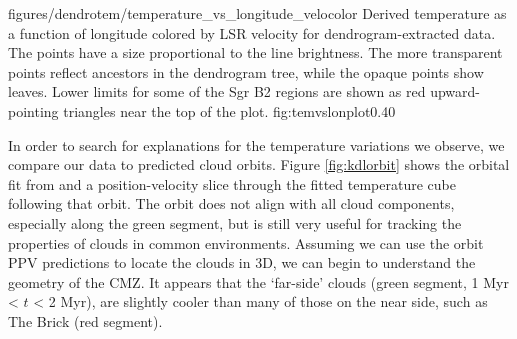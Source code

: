 

\Figure
{figures/dendrotem/temperature_vs_longitude_velocolor}
{Derived temperature as a function of longitude colored by LSR velocity for
dendrogram-extracted data.  The points have a size proportional to the
\threeohthree line brightness.  The more transparent points reflect ancestors
in the dendrogram tree, while the opaque points show leaves.  Lower limits
for some of the Sgr B2 regions are shown as red upward-pointing triangles near
the top of the plot.}
{fig:temvslonplot}{0.4}{0}

In order to search for explanations for the temperature variations we observe,
we compare our data to predicted cloud orbits.  Figure \ref{fig:kdlorbit} shows
the orbital fit from \citet{Kruijssen2015a} and a position-velocity slice
through the fitted temperature cube following that orbit.  The orbit does not
align with all cloud components, especially along the green segment, but is still
very useful for
tracking the properties of clouds in common environments.  Assuming we can use
the orbit PPV predictions to locate the clouds in 3D, we can begin to
understand the geometry of the CMZ.  It appears that the
`far-side' clouds (green segment, 1 Myr < $t$ < 2 Myr), are slightly cooler
than many of those on the near side, such as The Brick (red segment).  


